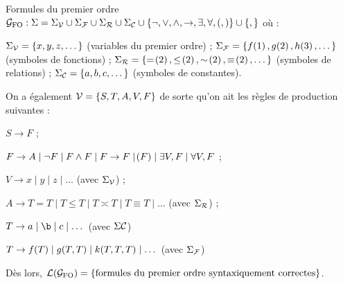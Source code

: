     
    \begin{example}{Formules du premier ordre}{}
        $\mathcal{G}_\text{FO} : \Sigma = \Sigma_{\mathcal{V}} \cup \Sigma_{\mathcal{F}} \cup \Sigma_{\mathcal{R}} \cup \Sigma_{\mathcal{C}} \cup \left\{\neg, \lor, \land, \rightarrow, \exists, \forall, (, )\right\} \cup \left\{,\right\}$ où :
        \begin{enumerate}
            \itt $\Sigma_{\mathcal{V}} = \left\{x, y, z, \dots\right\}$ (variables du premier ordre) ;
            \itt $\Sigma_{\mathcal{F}} = \left\{f \!\left(1\right), g\!\left(2\right), h\!\left(3\right), \dots\right\}$ (symboles de fonctions) ;
            \itt $\Sigma_\bcR = \ens{= \p{2}, \leq \p{2}, \asymp \p{2}, \equiv \p{2}, \dots}$ (symboles de relations) ;
            \itt $\Sigma_{\mathcal{C}} = \left\{a, b, c, \dots\right\}$ (symboles de constantes).
        \end{enumerate}
        On a également $\mathcal{V} = \left\{S, T, A, V, F\right\}$ de sorte qu'on ait les règles de production suivantes :
        \begin{enumerate}
            \itt $S \rightarrow F$ ;
            
            \itt $F \rightarrow A \mid \neg F \mid F \land F \mid F \rightarrow F \mid \!\left(F\right) \mid \exists V, F \mid \forall V, F$ ;
            
            \itt $V \rightarrow x \mid y \mid z \mid \dots$ (avec $\Sigma_{\mathcal{V}}$) ;
            
            \itt $A \rightarrow T = T \mid T \leq T \mid T \asymp T \mid T \equiv T \mid \dots$ (avec $\Sigma_{\mathcal{R}}$) ;
            
            \itt $T \rightarrow a \mid \b \mid c \mid \dots$ (avec $\Sigma\mathcal{C}$)
            
            \itt $T \rightarrow f\!\left(T\right) \mid g\!\left(T, T\right) \mid k\!\left(T, T, T\right) \mid \dots$ (avec $\Sigma_{\mathcal{F}}$)
        \end{enumerate}
        Dès lors, $\mathcal{L}\!\left(\mathcal{G}_\text{FO}\right) = \left\{\text{formules du premier ordre syntaxiquement correctes}\right\}$.
    \end{example}

